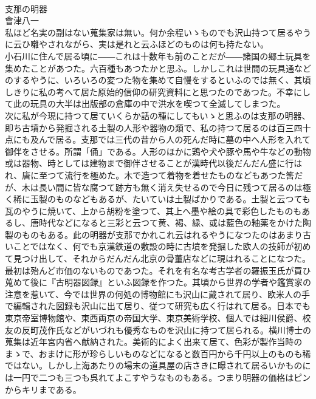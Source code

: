 \documentclass[8pt]{extreport}
\begin{document}
\begin{CJK}{UTF8}{min}
\\	支那の明器
\\	會津八一
\\	私ほど名実の副はない蒐集家は無い。何か余程いゝものでも沢山持つて居るやうに云ひ囃やされながら、実は是れと云ふほどのものは何も持たない。
\\	小石川に住んで居る頃に――これは十数年も前のことだが――諸国の郷土玩具を集めたことがあつた。六百種もあつたかと思ふ。しかしこれは世間の玩具通などのするやうに、いろいろの変つた物を集めて自慢をするといふのでは無く、其頃しきりに私の考へて居た原始的信仰の研究資料にと思つたのであつた。不幸にして此の玩具の大半は出版部の倉庫の中で洪水を喫つて全滅してしまつた。
\\	次に私が今現に持つて居ていくらか話の種にしてもいゝと思ふのは支那の明器、即ち古墳から発掘される土製の人形や器物の類で、私の持つて居るのは百三四十点にも及んで居る。支那では三代の昔から人の死んだ時に墓の中へ人形を入れて御伴をさせる。所謂「俑」である。人形のほかに鶏や犬や豚や馬や牛などの動物或は器物、時としては建物まで御伴させることが漢時代以後だんだん盛に行はれ、唐に至つて流行を極めた。木で造つて着物を着せたものなどもあつた筈だが、木は長い間に皆な腐つて跡方も無く消え失せるので今日に残つて居るのは極く稀に玉製のものなどもあるが、たいていは土製ばかりである。土製と云つても瓦のやうに焼いて、上から胡粉を塗つて、其上へ墨や絵の具で彩色したものもあるし、唐時代などになると三彩と云つて黄、褐、緑、或は藍色の釉薬をかけた陶製のものもある。此の明器が支那でかれこれ云はれるやうになつたのはあまり古いことではなく、何でも京漢鉄道の敷設の時に古墳を発掘した欧人の技師が初めて見つけ出して、それからだんだん北京の骨董店などに現はれることになつた。最初は殆んど市価のないものであつた。それを有名な考古学者の羅振玉氏が買ひ蒐めて後に『古明器図録』といふ図録を作つた。其頃から世界の学者や鑑賞家の注意を惹いて、今では世界の何処の博物館にも沢山に蔵されて居り、欧米人の手で編輯された図録も沢山に出て居り、従つて研究も広く行はれて居る。日本でも東京帝室博物館や、東西両京の帝国大学、東京美術学校、個人では細川侯爵、校友の反町茂作氏などがいづれも優秀なものを沢山に持つて居られる。横川博士の蒐集は近年宮内省へ献納された。美術的によく出来て居て、色彩が製作当時のまゝで、おまけに形が珍らしいものなどになると数百円から千円以上のものも稀ではない。しかし上海あたりの場末の道具屋の店さきに曝されて居るいかものには一円で二つも三つも呉れてよこすやうなものもある。つまり明器の価格はピンからキリまである。

\end{CJK}
\end{document}
